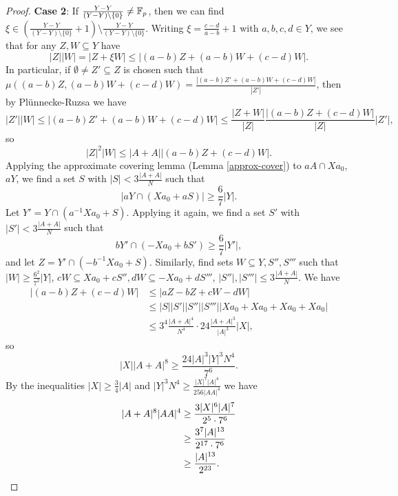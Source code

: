 \begin{proof}
\textbf{Case 2}: If $\frac{Y-Y}{(Y-Y)\setminus\{0\}} \ne \mathbb{F}_p$, then we can find $\xi \in \left(\frac{Y-Y}{(Y-Y)\setminus\{0\}}+1\right) \setminus \frac{Y-Y}{(Y-Y)\setminus\{0\}}$. Writing $\xi = \frac{c-d}{a-b}+1$ with $a,b,c,d \in Y$, we see that for any $Z,W \subseteq Y$ have
\[
|Z||W| = |Z + \xi W| \le |(a-b)Z + (a-b)W + (c-d)W|.
\]
In particular, if $\emptyset \ne Z'\subseteq Z$ is chosen such that $\mu((a-b)Z,(a-b)W+(c-d)W) = \frac{|(a-b)Z' + (a-b)W + (c-d)W|}{|Z'|}$, then by Pl\"unnecke-Ruzsa we have
\[
|Z'||W| \le |(a-b)Z' + (a-b)W + (c-d)W| \le \frac{|Z+W|}{|Z|}\frac{|(a-b)Z+(c-d)W|}{|Z|}|Z'|,
\]
so
\[
|Z|^2|W| \le |A+A||(a-b)Z+(c-d)W|.
\]
Applying the approximate covering lemma (Lemma \ref{approx-cover}) to $aA\cap Xa_0$, $aY$, we find a set $S$ with $|S| < 3\frac{|A+A|}{N}$ such that
\[
|aY \cap (Xa_0+aS)| \ge \frac{6}{7}|Y|.
\]
Let $Y' = Y \cap (a^{-1}Xa_0+S)$. Applying it again, we find a set $S'$ with $|S'| < 3\frac{|A+A|}{N}$ such that
\[
bY' \cap (-Xa_0 + bS') \ge \frac{6}{7}|Y'|,
\]
and let $Z = Y' \cap (-b^{-1}Xa_0+S)$. Similarly, find sets $W\subseteq Y,S'',S'''$ such that $|W| \ge \frac{6^2}{7^2}|Y|$, $cW \subseteq Xa_0+cS'', dW \subseteq -Xa_0+dS'''$, $|S''|,|S'''| \le 3\frac{|A+A|}{N}$. We have
\begin{align*}
|(a-b)Z+(c-d)W| &\le |aZ-bZ+cW-dW|\\
&\le |S||S'||S''||S'''||Xa_0+Xa_0+Xa_0+Xa_0|\\
&\le 3^4\frac{|A+A|^4}{N^4}\cdot 24\frac{|A+A|^3}{|A|^3}|X|,
\end{align*}
so
\[
|X||A+A|^8 \ge \frac{24|A|^3|Y|^3N^4}{7^6}.
\]
By the inequalities $|X| \ge \frac{3}{4}|A|$ and $|Y|^3N^4 \ge \frac{|X|^7|A|^4}{256|AA|^4}$ we have
\begin{align*}
|A+A|^8|AA|^4 &\ge \frac{3|X|^6|A|^7}{2^5\cdot 7^6}\\
&\ge \frac{3^7|A|^{13}}{2^{17}\cdot 7^6}\\
&\ge \frac{|A|^{13}}{2^{23}}.\qedhere
\end{align*}
\end{proof}


